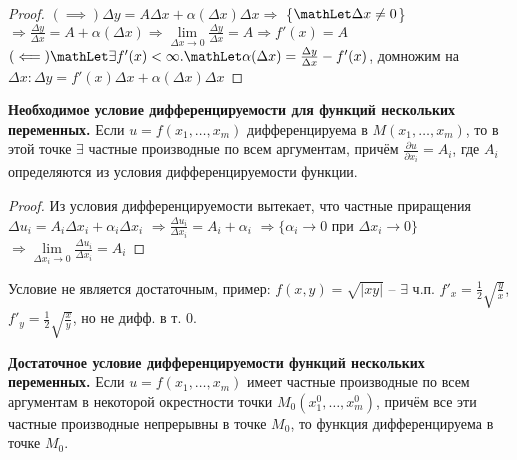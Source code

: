 \begin{proof} 
$(\implies) \Delta y = A \Delta x + \alpha(\Delta x)\Delta x \Rightarrow$ \{$\mathLet \Delta x \neq 0$\} $\Rightarrow \frac{\Delta y}{\Delta x}=A + \alpha(\Delta x) \Rightarrow \lim\limits_{\Delta x \to 0}\frac{\Delta y}{\Delta x}=A \Rightarrow f'(x) = A$\\
$(\impliedby) \mathLet \exists f'(x) < \infty. \mathLet \alpha(\Delta x)=\frac{\Delta y}{\Delta x}-f'(x)$, домножим на $\Delta x: \Delta y=f'(x)\Delta x+\alpha(\Delta x)\Delta x$
\end{proof}
\bigbreak

\textbf{Необходимое условие дифференцируемости для функций нескольких переменных.} Если $u = f(x_1,\dots,x_m)$ дифференцируема в $M(x_1,\dots,x_m)$, то в этой точке $\exists$ частные производные по всем аргументам, причём $\frac{\partial u}{\partial x_i} = A_i$, где $A_i$ определяются из условия дифференцируемости функции.

\begin{proof}
Из условия дифференцируемости вытекает, что частные приращения 
$\Delta u_i = A_i\Delta x_i+\alpha_i\Delta x_i$
$\Rightarrow \frac{\Delta u_i}{\Delta x_i} = A_i + \alpha_i $
$\Rightarrow \{\alpha_i \to 0$ при $\Delta x_i \to 0\} $
$\Rightarrow \lim\limits_{\Delta x_i \to 0}\frac{\Delta u_i}{\Delta x_i}=A_i$
\end{proof}

Условие не является достаточным, пример: $f(x, y) = \sqrt{\left|xy\right|}$ -- $\exists$ ч.п. 
$f'_x = \frac{1}{2} \sqrt{\frac{y}{x}}$, $f'_y = \frac{1}{2} \sqrt{\frac{x}{y}}$, но не дифф. в т. 0.
\bigbreak

\textbf{Достаточное условие дифференцируемости функций нескольких переменных.} Если $u = f(x_1,\dots,x_m)$ имеет частные производные по всем аргументам в некоторой окрестности точки $M_0(x^0_1, \dots, x^0_m)$, причём все эти частные производные непрерывны в точке $M_0$, то функция дифференцируема в точке $M_0$.

